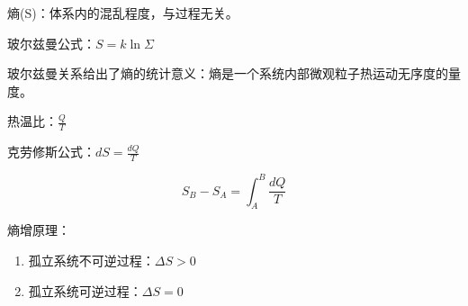 熵(S)：体系内的混乱程度，与过程无关。

玻尔兹曼公式：$S=\mathit{k}\ln{\Sigma}$

玻尔兹曼关系给出了熵的统计意义：熵是一个系统内部微观粒子热运动无序度的量度。

热温比：$\frac{Q}{T}$

克劳修斯公式：$dS=\frac{dQ}{T}$

\begin{equation}
    S_B-S_A=\int_A^B{\frac{dQ}{T}}
\end{equation}

熵增原理：
\begin{enumerate}
    \item 孤立系统不可逆过程：$\Delta{S}>0$
    \item 孤立系统可逆过程：$\Delta{S}=0$
\end{enumerate}

\newpage